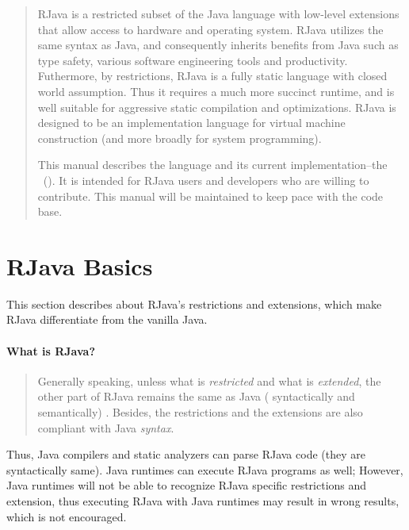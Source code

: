 \documentclass[12pt]{article}
\begin{document}
\begin{abstract}
RJava is a restricted subset of the Java language 
with low-level extensions
that allow access to hardware and operating system. 
RJava utilizes the same syntax as Java, and consequently
inherits benefits from Java such as type safety, 
various software engineering tools and productivity. Futhermore, 
by restrictions, RJava is a fully static language with closed world
assumption. Thus it requires a much more succinct runtime, and
is well suitable for aggressive static compilation and optimizations. 
RJava is designed to be an implementation language for virtual machine
construction (and more broadly for system programming). 

This manual describes the language and its 
current implementation--the \rjcfull~(\rjc). It is intended for RJava users
and developers who are willing to contribute. This manual will be
maintained to keep pace with the \rjc code base. 
\end{abstract}
\clearpage

\setcounter{secnumdepth}{5}
\setcounter{tocdepth}{5}
\tableofcontents 
\clearpage


\section{RJava Basics}

This section describes about RJava's restrictions and extensions, 
which make RJava differentiate from the vanilla Java. 

\paragraph*{What is RJava?}
\begin{quotation}
Generally speaking, unless what is \emph{restricted} and 
what is \emph{extended},
the other part of RJava remains the same as Java (
syntactically and semantically) . Besides,
the restrictions and the extensions are also
compliant with Java \emph{syntax}. 
\end{quotation}

\noindent
Thus, Java compilers and static analyzers can 
parse RJava code (they are syntactically same).
Java runtimes can
execute RJava programs as well; However, Java runtimes
will not be able to recognize RJava
specific restrictions and extension, thus executing
RJava with Java runtimes may result in wrong results, which
is not encouraged. 
\end{document}
